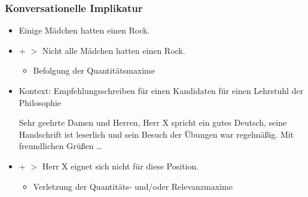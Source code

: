 \begin{frame}
\frametitle{Konversationelle Implikatur}

\begin{itemize}
	\item[]

	\ea Einige Mädchen hatten einen Rock.
	\z

	\item[] + $>$ Nicht alle Mädchen hatten einen Rock.
	
	\begin{itemize}
		\item Befolgung der Quantitätsmaxime
	\end{itemize}

\vspace{5mm}

	\item Kontext: Empfehlungsschreiben für einen Kandidaten für einen Lehrstuhl der Philosophie

	\ea Sehr geehrte Damen und Herren, Herr X spricht ein gutes Deutsch, seine Handschrift ist leserlich und sein Besuch der Übungen war regelmä\ss{}ig. Mit freundlichen Grü\ss{}en \dots
	\z
	
	\item[] + $>$ Herr X eignet sich nicht für diese Position.

	\begin{itemize}
		\item Verletzung der Quantitäts- und/oder Relevanzmaxime
	\end{itemize}
	
\end{itemize}

\end{frame}




